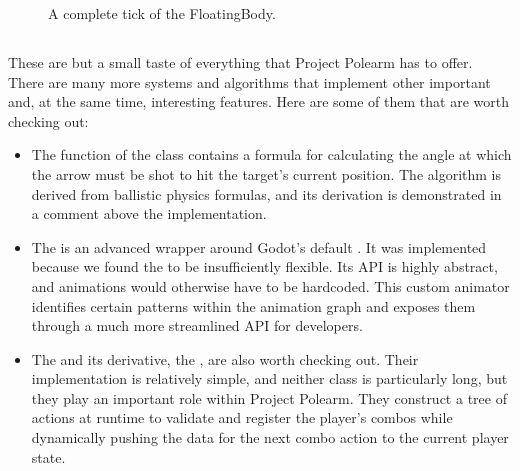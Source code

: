 \documentclass[../Main.tex]{subfiles}
\begin{document}
\begin{figure}[H]
    \centering
    
    \caption[A complete tick of the FloatingBody. Own figure.]{A complete tick of the FloatingBody.}
    \label{fig:floatingbody-tick}
\end{figure}

\subsection{}\label{sec:miscellaneous}

These are but a small taste of everything that Project Polearm has to offer. There are many more systems and algorithms that implement other important and, at the same time, interesting features. Here are some of them that are worth checking out:

\begin{itemize}
    \item The  function of the  class contains a formula for calculating the angle at which the arrow must be shot to hit the target's current position. The algorithm is derived from ballistic physics formulas, and its derivation is demonstrated in a comment above the implementation.

    \item The  is an advanced wrapper around Godot's default . It was implemented because we found the  to be insufficiently flexible. Its API is highly abstract, and animations would otherwise have to be hardcoded. This custom animator identifies certain patterns within the animation graph and exposes them through a much more streamlined API for developers.
    
    \item The  and its derivative, the , are also worth checking out. Their implementation is relatively simple, and neither class is particularly long, but they play an important role within Project Polearm. They construct a tree of actions at runtime to validate and register the player's combos while dynamically pushing the data for the next combo action to the current player state.
\end{itemize}

\newpage
\end{document}
